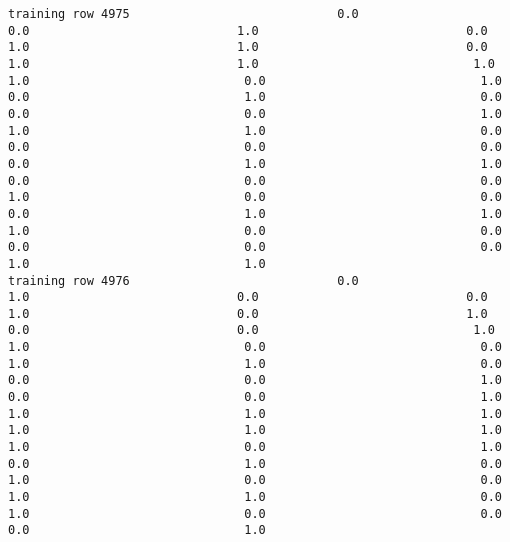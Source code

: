 \documentclass[11pt]{article}
\begin{document}
\begin{verbatim}
training row 4975                             0.0                             0.0                             1.0                             0.0                             1.0                             1.0                             0.0                             1.0                             1.0                              1.0                              1.0                              0.0                              1.0                              0.0                              1.0                              0.0                              0.0                              0.0                              1.0                              1.0                              1.0                              0.0                              0.0                              0.0                              0.0                              0.0                              1.0                              1.0                              0.0                              0.0                              0.0                              1.0                              0.0                              0.0                              0.0                              1.0                              1.0                              1.0                              0.0                              0.0                              0.0                              0.0                              0.0                              1.0                              1.0
training row 4976                             0.0                             1.0                             0.0                             0.0                             1.0                             0.0                             1.0                             0.0                             0.0                              1.0                              1.0                              0.0                              0.0                              1.0                              1.0                              0.0                              0.0                              0.0                              1.0                              0.0                              0.0                              1.0                              1.0                              1.0                              1.0                              1.0                              1.0                              1.0                              1.0                              0.0                              1.0                              0.0                              1.0                              0.0                              1.0                              0.0                              0.0                              1.0                              1.0                              0.0                              1.0                              0.0                              0.0                              0.0                              1.0

\end{verbatim}
\end{document}
